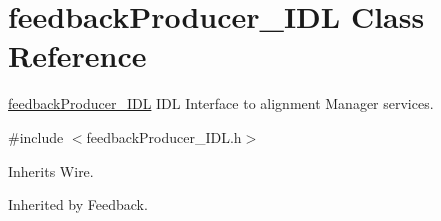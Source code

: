 \section{feedback\+Producer\+\_\+\+I\+DL Class Reference}
\label{classfeedbackProducer__IDL}


\mbox{\hyperlink{classfeedbackProducer__IDL}{feedback\+Producer\+\_\+\+I\+DL}} I\+DL Interface to alignment Manager services.  




{\ttfamily \#include $<$feedback\+Producer\+\_\+\+I\+D\+L.\+h$>$}



Inherits Wire.



Inherited by Feedback.

